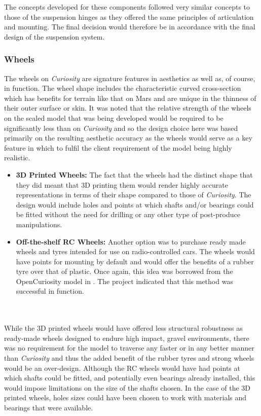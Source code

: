       The concepts developed for these components followed very similar concepts to those of the suspension hinges as they offered the same principles of articulation and mounting. The final decision would therefore be in accordance with the final design of the suspension system.
      
    \subsubsection{Wheels}
      The wheels on \textit{Curiosity} are signature features in aesthetics as well as, of course, in function. The wheel shape includes the characteristic curved cross-section which has benefits for terrain like that on Mars and are unique in the thinness of their outer surface or skin. It was noted that the relative strength of the wheels on the scaled model that was being developed would be required to be significantly less than on \textit{Curiosity} and so the design choice here was based primarily on the resulting aesthetic accuracy as the wheels would serve as a key feature in which to fulfil the client requirement of the model being highly realistic.
      
      \begin{itemize}
        \item \textbf{3D Printed Wheels:} The fact that the wheels had the distinct shape that they did meant that 3D printing them would render highly accurate representations in terms of their shape compared to those of \textit{Curiosity}. The design would include holes and points at which shafts and/or bearings could be fitted without the need for drilling or any other type of post-produce manipulations.
        
        \item \textbf{Off-the-shelf RC Wheels:} Another option was to purchase ready made wheels and tyres intended for use on radio-controlled cars. The wheels would have points for mounting by default and would offer the benefits of a rubber tyre over that of plastic. Once again, this idea was borrowed from the OpenCuriosity model in \cite{opencuriosity2014}. The project indicated that this method was successful in function.
      \end{itemize}
      
      \\\\
         While the 3D printed wheels would have offered less structural robustness as ready-made wheels designed to endure high impact, gravel environments, there was no requirement for the model to traverse any faster or in any better manner than \textit{Curiosity} and thus the added benefit of the rubber tyres and strong wheels would be an over-design. Although the RC wheels would have had points at which shafts could be fitted, and potentially even bearings already installed, this would impose limitations on the size of the shafts chosen. In the case of the 3D printed wheels, holes sizes could have been chosen to work with materials and bearings that were available.
         
